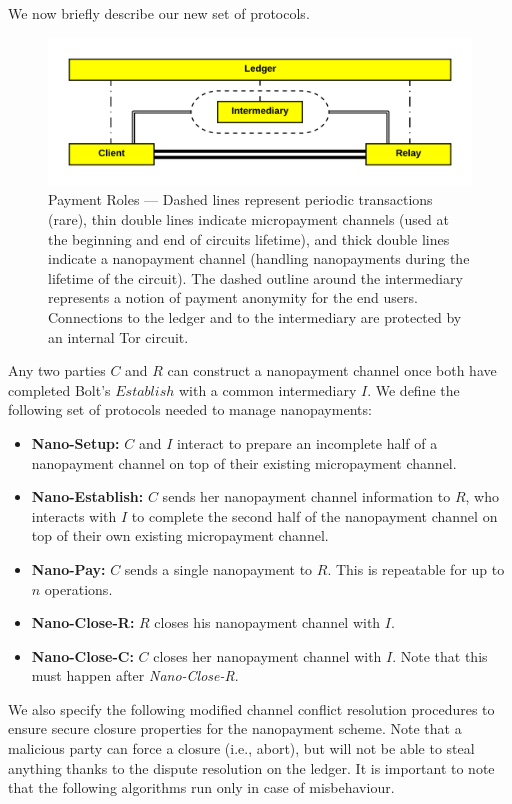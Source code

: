  We now briefly describe our new set of protocols.
\begin{figure}[h] \centering
  \includegraphics[trim={0.5cm, 0.5cm, 0.5cm, 0.5cm}, clip,
    scale=0.6]{images/party_diagram.png}
  \caption[Payment Roles]{Payment Roles --- Dashed lines represent periodic
    transactions (rare), thin double lines indicate micropayment channels (used
    at the beginning and end of circuits lifetime), and thick double lines
    indicate a nanopayment channel (handling nanopayments during the lifetime of
    the circuit). The dashed outline around the intermediary represents a notion
    of payment anonymity for the end users. Connections to the ledger and to the
    intermediary are protected by an internal Tor circuit.}
  \label{fig:parties}
\end{figure}
Any two parties $C$ and $R$ can construct a nanopayment channel once both have
completed Bolt's $Establish$ with a common intermediary $I$. We define the
following set of protocols needed to manage nanopayments:

\begin{itemize}
\item \textbf{Nano-Setup:} $C$ and $I$ interact to prepare an incomplete half of
  a nanopayment channel on top of their existing micropayment channel.
\item \textbf{Nano-Establish:} $C$ sends her nanopayment channel information to
  $R$, who interacts with $I$ to complete the second half of the nanopayment
  channel on top of their own existing micropayment channel.
\item \textbf{Nano-Pay:} $C$ sends a single nanopayment to $R$. This is
  repeatable for up to $n$ operations.
\item \textbf{Nano-Close-R:} $R$ closes his nanopayment channel with $I$.
\item \textbf{Nano-Close-C:} $C$ closes her nanopayment channel with $I$. Note
  that this must happen after \emph{Nano-Close-R}.
\end{itemize}

We also specify the following modified channel conflict resolution procedures to
ensure secure closure properties for the nanopayment scheme. Note that a
malicious party can force a closure (i.e., abort), but will not be able to steal
anything thanks to the dispute resolution on the ledger. It is important to note
that the following algorithms run only in case of misbehaviour.

